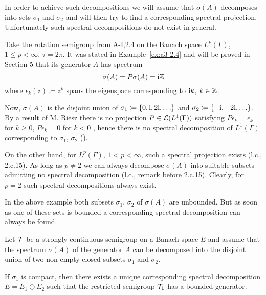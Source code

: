 In order to achieve such decompositions we will assume that $\sigma(A)$ decomposes into sets $\sigma_{1}$ and $\sigma_{2}$ and will then try to find a corresponding spectral projection.
Unfortunately such spectral decompositions do not exist in general.
\begin{example}\label{ex:a3-3.2}
Take the rotation semigroup from A-I,2.4 on the Banach space $L^{p}(\Gamma)$, $1 \leq p < \infty$, $\tau = 2\pi$.
It was stated in Example~\ref{ex:a3-2.4} and will be proved in Section 5 that its generator $A$ has spectrum
\[
\sigma(A) = P\sigma(A) = \mathrm{i}\mathbb{Z}
\]
where $\epsilon_{k}(z) \coloneqq z^{k}$ spans the eigenspace corresponding to $\mathrm{i} k$, $k \in \mathbb{Z}$.

Now, $\sigma(A)$ is the disjoint union of 
$\sigma_{1} \coloneqq \{0,\mathrm{i} ,2\mathrm{i}, \ldots\}$ 
and $\sigma_{2} \coloneqq \{-\mathrm{i}, -2\mathrm{i}, \ldots\}$.
By a result of M. Riesz there is no projection $P \in \mathcal{L}(L^{1}(\Gamma))$ satisfying $P\epsilon_{k} = \epsilon_{k}$ for $k \geq 0$, $P\epsilon_{k} = 0$ for $k < 0$ , hence there is no spectral decomposition of $L^{1}(\Gamma)$ corresponding to $\sigma_{1}$, $\sigma_{2}$ (\citet[p.165]{lindenstraustzafriri:1979}).

On the other hand, for $L^{p}(\Gamma)$, $1 < p < \infty$, such a spectral projection exists (l.c., 2.c.15).
As long as $p \neq 2$ we can always decompose $\sigma(A)$ into suitable subsets admitting no spectral decomposition (l.c., remark before 2.c.15).
Clearly, for $p = 2$ such spectral decompositions always exist.
\end{example}
In the above example both subsets $\sigma_{1}$, $\sigma_{2}$ of $\sigma(A)$ are unbounded.
But as soon as one of these sets is bounded a corresponding spectral decomposition can always be found.
\begin{theorem}\label{thm:a3-3.3}
Let $\mathcal{T}$ be a strongly continuous semigroup on a Banach space $E$ and assume that the spectrum $\sigma(A)$ of the generator $A$ can be decomposed into the disjoint union of two non-empty closed subsets $\sigma_{1}$ and 
$\sigma_{2}$.

If $\sigma_{1}$ is compact, then there exists a unique corresponding spectral decomposition $E = E_{1} \oplus E_{2}$ such that the restricted semigroup $\mathcal{T}_{1}$ has a bounded generator.
\end{theorem}

